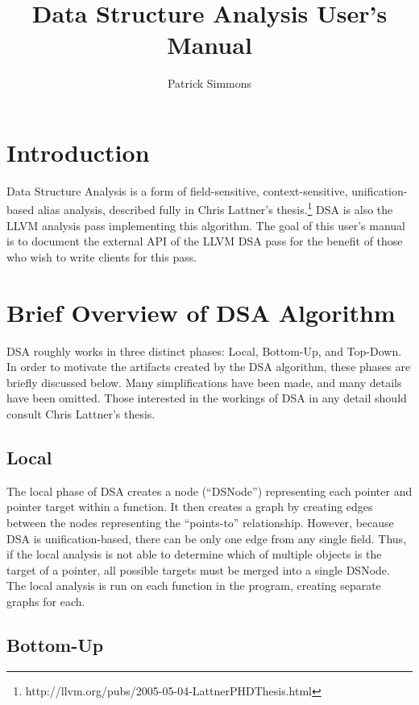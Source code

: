 \documentclass{article}
\begin{document}
\title{Data Structure Analysis User's Manual}
\author{Patrick Simmons}

\maketitle

\section{Introduction}

Data Structure Analysis is a form of field-sensitive,
context-sensitive, unification-based alias analysis, described fully
in Chris Lattner's
thesis.\footnote{http://llvm.org/pubs/2005-05-04-LattnerPHDThesis.html}
DSA is also the LLVM analysis pass implementing this algorithm.  The
goal of this user's manual is to document the external API of the LLVM
DSA pass for the benefit of those who wish to write clients for this
pass.

\section{Brief Overview of DSA Algorithm}

DSA roughly works in three distinct phases: Local, Bottom-Up, and
Top-Down.  In order to motivate the artifacts created by the DSA
algorithm, these phases are briefly discussed below.  Many
simplifications have been made, and many details have been omitted.
Those interested in the workings of DSA in any detail should consult
Chris Lattner's thesis.

\subsection{Local}

The local phase of DSA creates a node (``DSNode'') representing each
pointer and pointer target within a function.  It then creates a graph
by creating edges between the nodes representing the ``points-to''
relationship.  However, because DSA is unification-based, there can be
only one edge from any single field.  Thus, if the local analysis is
not able to determine which of multiple objects is the target of a
pointer, all possible targets must be merged into a single DSNode.
The local analysis is run on each function in the program, creating
separate graphs for each.

\subsection{Bottom-Up}
\end{document}
